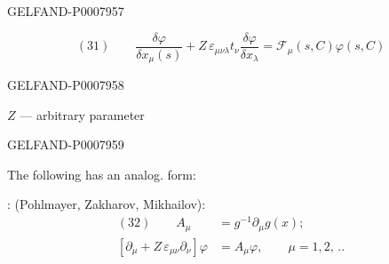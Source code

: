 \begin{GelfandAdjacentEvidence}{GELFAND-P000795}{7}


\[
(31)\qquad
\frac{\delta\varphi}{\delta x_\mu(s)}
+Z\,\varepsilon_{\mu\nu\lambda}t_\nu\frac{\delta\varphi}{\delta x_\lambda}
=\mathcal{F}_\mu(s,C)\varphi(s,C)
\]
\end{GelfandAdjacentEvidence}
\begin{GelfandAdjacentEvidence}{GELFAND-P000795}{8}


\(Z\) --- arbitrary parameter
\end{GelfandAdjacentEvidence}
\begin{GelfandAdjacentEvidence}{GELFAND-P000795}{9}


The following has an analog. form:

: (Pohlmayer, Zakharov, Mikhailov):
\[
\begin{aligned}
(32)\qquad A_\mu&=g^{-1}\partial_\mu g(x);\\
\left[\partial_\mu+Z\,\varepsilon_{\mu\nu}\partial_\nu\right]\varphi
&=A_\mu\varphi,\qquad\mu=1,2,\,..
\end{aligned}
\]
\end{GelfandAdjacentEvidence}



